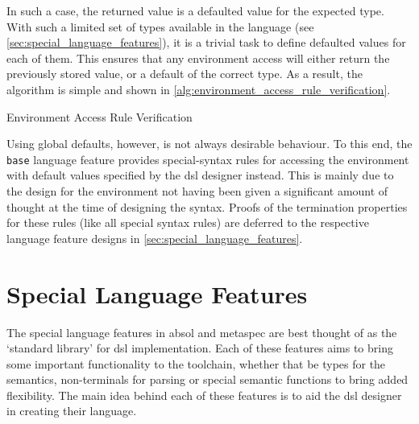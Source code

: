 In such a case, the returned value is a defaulted value for the expected type.
With such a limited set of types available in the language (see \autoref{sec:special_language_features}), it is a trivial task to define defaulted values for each of them.
This ensures that any environment access will either return the previously stored value, or a default of the correct type. 
As a result, the algorithm is simple and shown in \autoref{alg:environment_access_rule_verification}.

\begin{algorithm}
\begin{algorithmic}
    \State {}
\EndFunction
\end{algorithmic}
\caption{Environment Access Rule Verification}
\label{alg:environment_access_rule_verification}
\end{algorithm}

Using global defaults, however, is not always desirable behaviour. 
To this end, the \texttt{base} language feature provides special-syntax rules for accessing the environment with default values specified by the \gls{dsl} designer instead.
This is mainly due to the design for the environment not having been given a significant amount of thought at the time of designing the syntax.
Proofs of the termination properties for these rules (like all special syntax rules) are deferred to the respective language feature designs in \autoref{sec:special_language_features}.




\section{Special Language Features} %
\label{sec:special_language_features}

The special language features in \gls{absol} and \gls{metaspec} are best thought of as the `standard library' for \gls{dsl} implementation.
Each of these features aims to bring some important functionality to the toolchain, whether that be types for the semantics, non-terminals for parsing or special semantic functions to bring added flexibility. 
The main idea behind each of these features is to aid the \gls{dsl} designer in creating their language. \\

